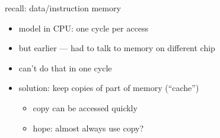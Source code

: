 
\begin{frame}{recall: data/instruction memory}
    \begin{itemize}
    \item model in CPU: one cycle per access
    \vspace{.5cm}
    \item but earlier --- had to talk to memory on different chip
    \item can't do that in one cycle
    \vspace{.5cm}
    \item solution: keep copies of part of memory (``cache'')
        \begin{itemize}
        \item copy can be accessed quickly
        \item hope: almost always use copy?
        \end{itemize}
    \end{itemize}
\end{frame}

